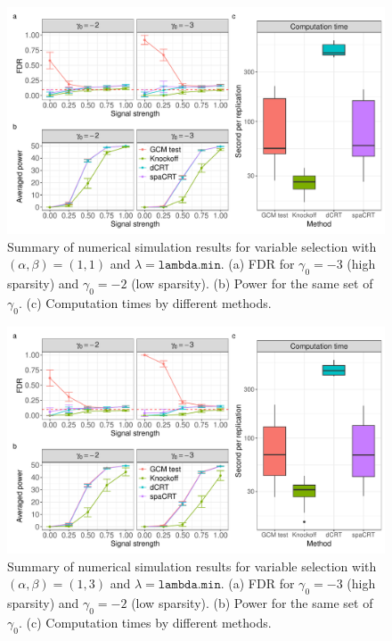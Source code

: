 \documentclass[12pt]{article}
\theoremstyle{definition}
\begin{document}
\begin{figure}[!ht]
  \centering
  \includegraphics[width=1.0\textwidth]{figures-and-tables/simulation/HMM-variable-selection/HMM_simulation_uniform_lambda.min.pdf}
  \caption{Summary of numerical simulation results for variable selection with $(\alpha,\beta)=(1,1)$ and $\lambda=\texttt{lambda.min}$. (a) FDR for $\gamma_0=-3$ (high sparsity) and $\gamma_0=-2$ (low sparsity). (b) Power for the same set of $\gamma_0$. (c) Computation times by different methods. }
  \label{fig:simulation-summary-GWAS-uniform-lambda-min}
\end{figure}


\begin{figure}[!ht]
  \centering
  \includegraphics[width=1.0\textwidth]{figures-and-tables/simulation/HMM-variable-selection/HMM_simulation_skew_lambda.min.pdf}
  \caption{Summary of numerical simulation results for variable selection with $(\alpha,\beta)=(1,3)$ and $\lambda=\texttt{lambda.min}$. (a) FDR for $\gamma_0=-3$ (high sparsity) and $\gamma_0=-2$ (low sparsity). (b) Power for the same set of $\gamma_0$. (c) Computation times by different methods. }
  \label{fig:simulation-summary-GWAS-skew-lambda-min}
\end{figure}
\end{document}
